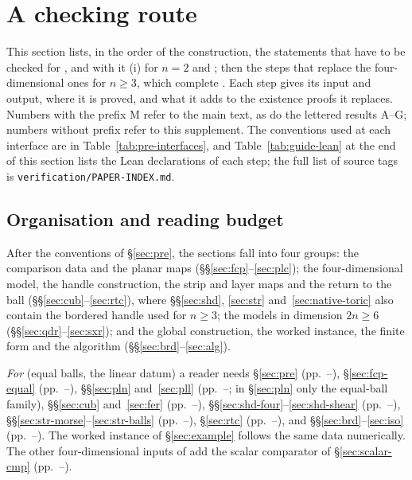 \section{A checking route}\label{sec:guide}
\begingroup\sloppy
\newcommand{\Spp}[2]{pp.~\pageref{#1}--\pageref{#2}}

This section lists, in the order of the construction, the statements that have to be checked for
, and with it (i) for $n=2$ and ;
then the steps that replace the four-dimensional ones for $n\ge3$, which complete . Each step
gives its input and output, where it is proved, and what it adds to the existence proofs it replaces. Numbers with the
prefix M refer to the main text, as do the lettered results A--G; numbers without prefix refer to this supplement. The conventions used at each
interface are in Table~\ref{tab:pre-interfaces}, and Table~\ref{tab:guide-lean} at the end of this section lists the
Lean declarations of each step; the full list of source tags is \texttt{verification/PAPER-INDEX.md}.

\subsection*{Organisation and reading budget}

After the conventions of \S\ref{sec:pre}, the sections fall into four groups: the comparison data and the planar maps
(\S\S\ref{sec:fcp}--\ref{sec:plc}); the four-dimensional model, the handle construction, the strip and layer maps and the
return to the ball (\S\S\ref{sec:cub}--\ref{sec:rtc}), where \S\S\ref{sec:shd}, \ref{sec:str} and~\ref{sec:native-toric}
also contain the bordered handle used for $n\ge3$; the models in dimension $2n\ge6$ (\S\S\ref{sec:qdr}--\ref{sec:sxr});
and the global construction, the worked instance, the finite form and the algorithm
(\S\S\ref{sec:brd}--\ref{sec:alg}).

\emph{For } (equal balls, the linear datum) a reader needs \S\ref{sec:pre}
(\Spp{sec:pre}{sec:fcp}), \S\ref{sec:fcp-equal} (\Spp{sec:fcp-equal}{sec:pln}), \S\S\ref{sec:pln} and~\ref{sec:pll}
(\Spp{sec:pln}{sec:scalar-cmp}; in \S\ref{sec:pln} only the equal-ball family), \S\S\ref{sec:cub} and~\ref{sec:fer}
(\Spp{sec:cub}{sec:shd}), \S\S\ref{sec:shd-four}--\ref{sec:shd-shear} (\Spp{sec:shd-four}{sec:str}),
\S\S\ref{sec:str-morse}--\ref{sec:str-balls} (\Spp{sec:str-morse}{sec:str-layer-coords}), \S\ref{sec:rtc}
(\Spp{sec:rtc}{sec:qdr}), and \S\S\ref{sec:brd}--\ref{sec:iso} (\Spp{sec:brd}{sec:example}). The worked instance of
\S\ref{sec:example} follows the same data numerically. The other four-dimensional inputs of  add
the scalar comparator of \S\ref{sec:scalar-cmp} (\Spp{sec:scalar-cmp}{sec:plc}).

